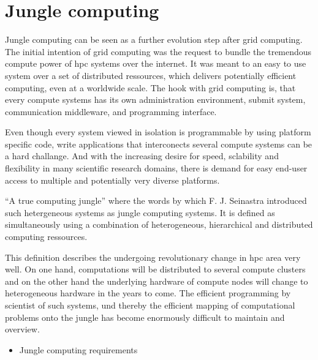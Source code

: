 \section{Jungle computing}

Jungle computing can be seen as a further evolution step after
grid computing. The initial intention of grid computing was
the request to bundle the tremendous compute power of hpc
systems over the internet\cite{ref:grid}. It was meant to an
easy to use system over a set of distributed ressources, which
delivers potentially efficient computing, even at a worldwide scale.
The hook with grid computing is, that every compute systems has its
own administration environment, submit system, communication middleware,
and programming interface. 

Even though every system viewed in isolation is programmable by using
platform specific code, write applications that interconects several
compute systems can be a hard challange. And with the increasing
desire for speed, sclability and flexibility in many scientific research
domains, there is demand for easy end-user access to multiple and potentially
very diverse platforms.

``A true computing jungle'' where the words by which F. J. Seinastra
introduced such hetergeneous systems as jungle computing
systems\cite{ref:jungle}. It is defined as simultaneously using a
combination of heterogeneous, hierarchical and distributed computing
ressources.

This definition describes the undergoing revolutionary change in 
hpc area very well. On one hand, computations will be distributed
to several compute clusters and on the other hand the underlying
hardware of compute nodes will change to heterogeneous hardware in
the years to come. The efficient programming by scientist of such systems, 
und thereby the efficient mapping of computational problems onto
the jungle has become enormously difficult to maintain and overview.


\begin{itemize}
  \item Jungle computing requirements
\end{itemize}


